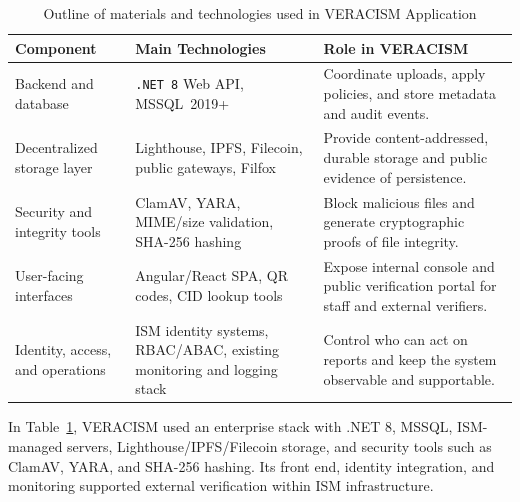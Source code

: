 \begin{table}[H]
  \centering
  \smalltable
  \footnotesize

  {%
  \setlength{\tabcolsep}{8pt}%
  \renewcommand{\arraystretch}{1.4}%

  \begin{tabular}{|>{\raggedright\arraybackslash}p{}|
                  >{\raggedright\arraybackslash}p{}|
                  >{\raggedright\arraybackslash}p{}|}
    \hline
    \textbf{Component} & \textbf{Main Technologies} & \textbf{Role in VERACISM} \\
    \hline\hline
    Backend and database &
    \texttt{.NET~8} Web API, MSSQL~2019+ &
    Coordinate uploads, apply policies, and store metadata and audit events. \\
    \hline
    Decentralized storage layer &
    Lighthouse, IPFS, Filecoin, public gateways, Filfox &
    Provide content-addressed, durable storage and public evidence of persistence. \\
    \hline
    Security and integrity tools &
    ClamAV, YARA, MIME/size validation, SHA-256 hashing &
    Block malicious files and generate cryptographic proofs of file integrity. \\
    \hline
    User-facing interfaces &
    Angular/React SPA, QR codes, CID lookup tools &
    Expose internal console and public verification portal for staff and external verifiers. \\
    \hline
    Identity, access, and operations &
    ISM identity systems, RBAC/ABAC, existing monitoring and logging stack &
    Control who can act on reports and keep the system observable and supportable. \\
    \hline
  \end{tabular}
  }%

  \captionsetup{type=table}
  \caption{Outline of materials and technologies used in VERACISM Application}
  \label{table:materials-technologies-summary}
\end{table}

In Table~\ref{table:materials-technologies-summary}, VERACISM used an enterprise stack with .NET 8, MSSQL, ISM-managed servers, Lighthouse/IPFS/Filecoin storage, and security tools such as ClamAV, YARA, and SHA-256 hashing. Its front end, identity integration, and monitoring supported external verification within ISM infrastructure.

